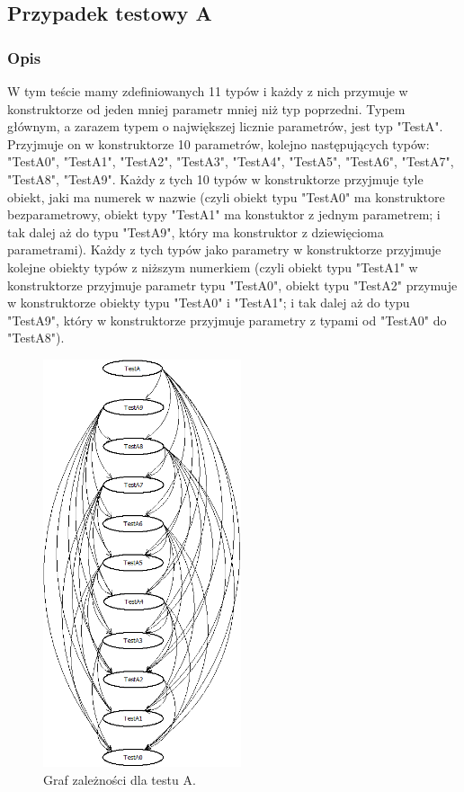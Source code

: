 \documentclass[12pt]{article}
\begin{document}
\subsection{Przypadek testowy A}
\subsubsection{Opis}
W tym teście mamy zdefiniowanych 11 typów i każdy z nich przymuje w konstruktorze od jeden mniej parametr mniej niż typ poprzedni. Typem głównym, a zarazem typem o największej licznie parametrów, jest typ "TestA". Przyjmuje on w konstruktorze 10 parametrów, kolejno następujących typów: "TestA0", "TestA1", "TestA2", "TestA3", "TestA4", "TestA5", "TestA6", "TestA7", "TestA8", "TestA9". Każdy z tych 10 typów w konstruktorze przyjmuje tyle obiekt, jaki ma numerek w nazwie (czyli obiekt typu "TestA0" ma konstruktore bezparametrowy, obiekt typy "TestA1" ma konstuktor z jednym parametrem; i tak dalej aż do typu "TestA9", który ma konstruktor z dziewięcioma parametrami). Każdy z tych typów jako parametry w konstruktorze przyjmuje kolejne obiekty typów z niższym numerkiem (czyli obiekt typu "TestA1" w konstruktorze przyjmuje parametr typu "TestA0", obiekt typu "TestA2" przymuje w konstruktorze obiekty typu "TestA0" i "TestA1";  i tak dalej aż do typu "TestA9", który w konstruktorze przyjmuje parametry z typami od "TestA0" do "TestA8").\\

\begin{figure}[h]
	\begin{center}
  		\includegraphics[height=12cm]{TestA.png}
  		\caption{Graf zależności dla testu A.}
  		\label{fig:testA}
	\end{center}
\end{figure}
\end{document}
